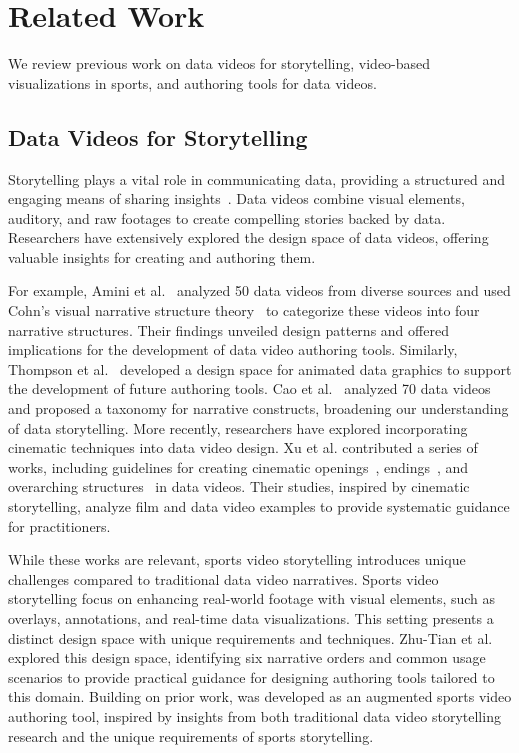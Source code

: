 \section{Related Work}
We review previous work on data videos for storytelling, video-based visualizations in sports, and authoring tools for data videos.

\subsection{Data Videos for Storytelling}

Storytelling plays a vital role in communicating data, providing a structured and engaging means of sharing insights~\cite{DBLP:journals/tvcg/SegelH10}. 
Data videos combine visual elements, auditory, and raw footages to create compelling stories backed by data. 
Researchers have extensively explored the design space of data videos, 
offering valuable insights for creating and authoring them.

For example, Amini et al.~\cite{DBLP:conf/chi/AminiRLHI15} analyzed 50 data videos from diverse sources and used Cohn's visual narrative structure theory~\cite{DBLP:journals/cogsci/Cohn13} to categorize these videos into four narrative structures.
Their findings unveiled design patterns and offered implications for the development of data video authoring tools.
Similarly, Thompson et al.~\cite{DBLP:journals/cgf/ThompsonLLS20} developed a design space for animated data graphics to support the development of future authoring tools. 
Cao et al.~\cite{DBLP:journals/vi/CaoDCWSZT20} analyzed 70 data videos and proposed a taxonomy for  narrative constructs, broadening our understanding of data storytelling.
More recently, researchers have explored incorporating cinematic techniques into data video design.
Xu et al. contributed a series of works, including guidelines for creating cinematic openings~\cite{DBLP:conf/chi/XuYY0WQ22}, endings~\cite{DBLP:conf/chi/XuWYWHYQ23}, and overarching structures~\cite{wei2024telling} in data videos. 
Their studies, inspired by cinematic storytelling, analyze film and data video examples to provide systematic guidance for practitioners.

While these works are relevant, sports video storytelling introduces unique challenges compared to traditional data video narratives.
Sports video storytelling focus on enhancing real-world footage with visual elements, such as overlays, annotations, and real-time data visualizations.
This setting presents a distinct design space with unique requirements and techniques.
Zhu-Tian et al.~\cite{chen2021augmenting} explored this design space, identifying six narrative orders and common usage scenarios to provide practical guidance for designing authoring tools tailored to this domain.
Building on prior work, \SB{} was developed as an augmented sports video authoring tool, inspired by insights from both traditional data video storytelling research and the unique requirements of sports storytelling.

